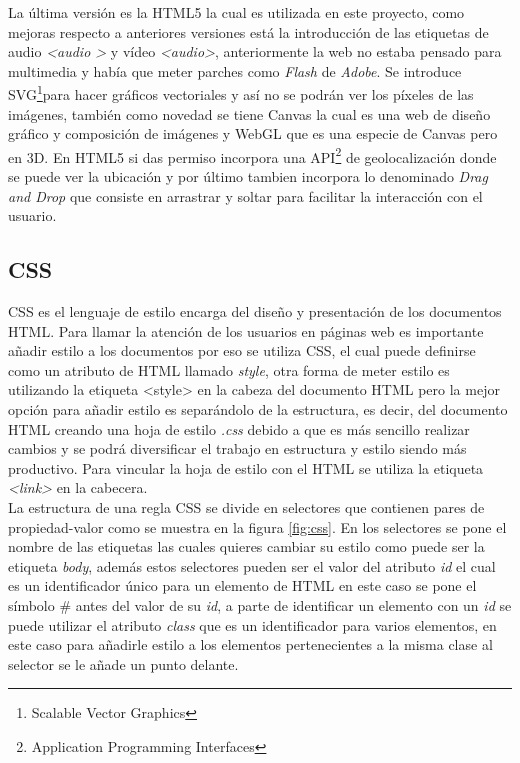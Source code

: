 La última versión es la HTML5 la cual es utilizada en este proyecto, como mejoras respecto a anteriores versiones está la introducción de las etiquetas de audio \textit{\textless audio \textgreater} y vídeo \textit{\textless audio\textgreater}, anteriormente la web no estaba pensado para multimedia y había que meter parches como\textit{ Flash} de \textit{Adobe}. Se introduce SVG\footnote{Scalable Vector Graphics }para hacer gráficos vectoriales y así no se podrán ver los píxeles de las imágenes, también como novedad se tiene Canvas la cual es una web de diseño gráfico y composición de imágenes y WebGL que es una especie de Canvas pero en 3D. En HTML5 si das permiso incorpora una API\footnote{Application Programming Interfaces} de geolocalización donde se puede ver la ubicación y por último tambien incorpora lo denominado \textit{Drag and Drop} que consiste en arrastrar y soltar para facilitar la interacción con el usuario.\\

\newpage
\subsection{CSS}
CSS es el lenguaje de estilo encarga del diseño y presentación de los documentos HTML. Para llamar la atención de los usuarios en páginas web es importante añadir estilo a los documentos por eso se utiliza CSS, el cual puede definirse como un atributo de HTML llamado\textit{ style}, otra forma de meter estilo es utilizando la etiqueta {\textless style\textgreater} en la cabeza del documento HTML pero la mejor opción para añadir estilo es separándolo de la estructura, es decir, del documento HTML creando una hoja de estilo \textit{.css}  debido a que es más sencillo realizar cambios y se podrá diversificar el trabajo en estructura y estilo siendo más productivo. Para vincular la hoja de estilo con el HTML se utiliza la etiqueta \textit{\textless link\textgreater} en la cabecera.\\

La estructura de una regla CSS se divide en selectores que contienen pares de propiedad-valor como se muestra en la figura \ref{fig:css}. En los selectores se pone el nombre de las etiquetas las cuales quieres cambiar su estilo como puede ser la etiqueta \textit{body}, además estos selectores pueden ser el valor del atributo \textit{id} el cual es un identificador único para un elemento de HTML en este caso se pone el símbolo # antes del valor de su \textit{id}, a parte de identificar un elemento con un \textit{id} se puede utilizar el atributo \textit{class }que es un identificador para varios elementos, en este caso para añadirle estilo a los elementos pertenecientes a la misma clase al selector se le añade un punto delante.

